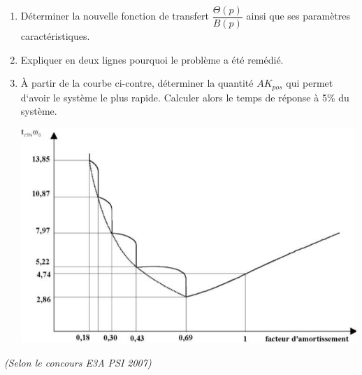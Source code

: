 \begin{enumerate}
\item Déterminer la nouvelle fonction de transfert $\dfrac{\Theta(p)}{B(p)}$
ainsi que ses paramètres caractéristiques.


\item Expliquer en deux lignes pourquoi le problème a été remédié.

\item À partir de la courbe ci-contre, déterminer la quantité $AK_{pos}$ qui
permet d‘avoir le système le plus rapide. Calculer alors le temps de réponse à
5\% du système.

\begin{center}
 \includegraphics[width=.6\textwidth]{png/image7}
\end{center}
\end{enumerate}
\newpage


\textit{(Selon le concours E3A PSI 2007)}
\vspace{0.25cm}


